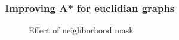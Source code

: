 \begin{frame}
\frametitle{Improving A* for euclidian graphs}
\begin{figure}[ht]
\caption{Effect of neighborhood mask}
\label{fig:}
\end{figure}
\end{frame}
